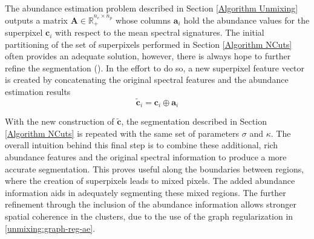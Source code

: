 The abundance estimation problem described in Section \ref{Algorithm Unmixing} outputs a matrix $ \mathbf{A} \in \mathbb{R}_+^{n_e \times n_p}$ whose columns $\mathbf{a}_i$ hold the abundance values for the superpixel $\mathbf{c}_i$ with respect to the mean spectral signatures. The initial partitioning of the set of superpixels performed in Section \ref{Algorithm NCuts} often provides an adequate solution, however, there is always hope to further refine the segmentation (\cite{SSBD}). In the effort to do so, a new superpixel feature vector is created by concatenating the original spectral features and the abundance estimation results
\begin{equation}
    \label{Feature Vector Creation}
    \tilde{\mathbf{c}}_i = \mathbf{c}_i \oplus \mathbf{a}_i
\end{equation}

With the new construction of $\tilde{\mathbf{c}}$, the segmentation described in Section \ref{Algorithm NCuts} is repeated with the same set of parameters $\sigma$ and $\kappa$. The overall intuition behind this final step is to combine these additional, rich abundance features and the original spectral information to produce a more accurate segmentation. This proves useful along the boundaries between regions, where the creation of superpixels leads to mixed pixels. The added abundance information aids in adequately segmenting these mixed regions. The further refinement through the inclusion of the abundance information allows stronger spatial coherence in the clusters, due to the use of the graph regularization in \eqref{unmixing:graph-reg-ae}.

